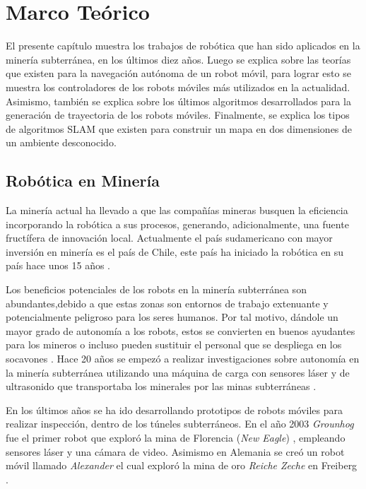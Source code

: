 \chapter{Marco Teórico}
El presente capítulo muestra los trabajos de robótica que han sido aplicados en 
la minería subterránea, en los últimos diez años. Luego se explica sobre las teorías
que existen para la navegación autónoma de un robot móvil, para lograr esto se muestra
los controladores de los robots móviles más utilizados en la actualidad. Asimismo, también
se explica sobre los últimos algoritmos desarrollados para la generación de trayectoria de 
los robots móviles. Finalmente, se explica los tipos de algoritmos SLAM que existen para 
construir un mapa en dos dimensiones de un ambiente desconocido.

\section{Rob\'otica en Miner\'ia}
La minería actual ha llevado a que las compañías mineras busquen la eficiencia 
incorporando la robótica a sus procesos, generando, adicionalmente, una fuente 
fructífera de innovación local. Actualmente el país sudamericano con mayor inversión 
en minería es el país de Chile, este país ha iniciado la robótica en su país hace 
unos 15 años \cite{Carmona2014}.

Los beneficios potenciales de los robots en la minería subterránea son abundantes,debido 
a que estas zonas son entornos de trabajo extenuante y potencialmente peligroso para 
los seres humanos. Por tal motivo, dándole un mayor grado de autonomía a los robots, estos 
se convierten en buenos ayudantes para los mineros o incluso pueden sustituir el personal 
que se despliega en los socavones \cite{Carmona2014}. Hace 20 años se empezó a realizar 
investigaciones sobre autonomía en la minería subterránea utilizando una máquina de carga 
con sensores láser y de ultrasonido que transportaba los minerales por las minas 
subterráneas \cite{Scheding1999}. 

En los últimos años se ha ido desarrollando prototipos de robots móviles para 
realizar inspección, dentro de los túneles subterráneos. En el año 2003 \textit{Grounhog}
fue el primer robot que exploró la mina de Florencia (\textit{New Eagle}) 
\cite{Thrun2004}, empleando sensores láser y una cámara de video. Asimismo en Alemania se 
creó un robot móvil llamado \textit{Alexander} el cual exploró la mina de oro 
\textit{Reiche Zeche} en Freiberg \cite{Grehl2015}.

